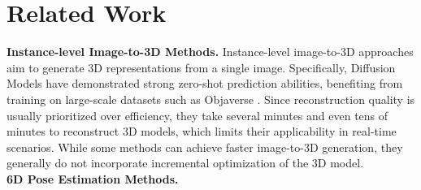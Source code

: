 \section{Related Work}
\label{rel}
\noindent\textbf{Instance-level Image-to-3D Methods.}
Instance-level image-to-3D approaches \cite{wonder3d, zero123++,instantmesh,vqadiff} aim to generate 3D representations from a single image. Specifically, Diffusion Models \cite{zero123++, wonder3d} have demonstrated strong zero-shot prediction abilities, benefiting from training on large-scale datasets such as Objaverse \cite{obj}. Since reconstruction quality is usually prioritized over efficiency, they take several minutes and even tens of minutes to reconstruct 3D models, which limits their applicability in real-time scenarios. While some methods \cite{instantmesh,vqadiff} can achieve faster image-to-3D generation, they generally do not incorporate incremental optimization of the 3D model.\\
\noindent\textbf{6D Pose Estimation Methods.}
